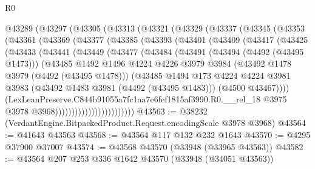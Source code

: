 \begin{lexlean}{R0}
\begin{coremodule}
    @43289
      (@43297
        (@43305
          (@43313
            (@43321
              (@43329
                (@43337
                  (@43345
                    (@43353
                      (@43361
                        (@43369
                          (@43377
                            (@43385
                              (@43393
                                (@43401
                                  (@43409
                                    (@43417
                                      (@43425
                                        (@43433
                                          (@43441
                                            (@43449
                                              (@43477
                                                (@43484
                                                  (@43491
                                                    (@43494 (@4492 (@43495 @1473)))
                                                    (@43485
                                                      @1492
                                                      @1496
                                                      @4224
                                                      @4226
                                                      @3979
                                                      @3984
                                                      (@43492 @1478 @3979 (@4492 (@43495 @1478)))
                                                      (@43485
                                                        @1494
                                                        @173
                                                        @4224
                                                        @4224
                                                        @3981
                                                        @3983
                                                        (@43492 @1483 @3981 (@4492 (@43495 @1483)))
                                                        (@4500 @43467))))
                                                  (LexLeanPreserve.C844b91055a7fc1aa7e6fef1815af3990.R0.__rel_18
                                                    @3975
                                                    @3978
                                                    @3968))))))))))))))))))))))))
@43563 := @38232 (VerdantEngine.BitpackedProduct.Request.encodingScale @3978 @3968)
@43564 := @41643 @43563
@43568 := @43564 @117 @132 @232 @1643
@43570 := @4295 @37900 @37007
@43574 := @43568 @43570 (@33948 (@33965 @43563))
@43582 := @43564 @207 @253 @336 @1642 @43570 (@33948 (@34051 @43563))

\end{coremodule}
\end{lexlean}

